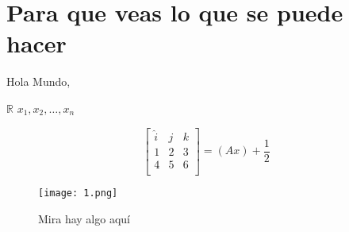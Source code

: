 \section{Para que veas lo que se puede hacer}
Hola Mundo, \cite{orimo2006reviewing}

\lipsum[2] \newline

$\mathbb{R}$
$x_1,x_2,\dots, x_n$

\begin{equation}
            \begin{bmatrix}
        \hat{i}&j&k\\
        1&2&3\\
4&5&6\\
    \end{bmatrix} = (Ax)+\frac{1}{2}
\end{equation}

\begin{figure}[ht]
  \centerline{\texttt{[image: 1.png]}}
  \caption{Mira hay algo aquí}
  \label{1}
\end{figure}
